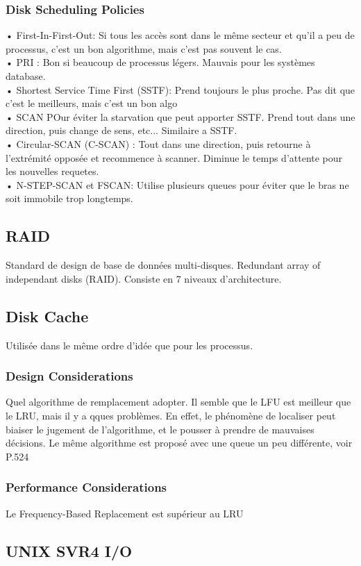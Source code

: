 \subsubsection{Disk Scheduling Policies}
• First-In-First-Out: Si tous les accès sont dans le même secteur et qu’il a peu de processus, c’est un bon algorithme, mais c’est pas souvent le cas. \\
• PRI : Bon si beaucoup de processus légers. Mauvais pour les systèmes database.\\
• Shortest Service Time First (SSTF): Prend toujours le plus proche. Pas dit que
c’est le meilleurs, mais c’est un bon algo \\
• SCAN POur éviter la starvation que peut apporter SSTF. Prend tout dans une direction, puis change de sens, etc... Similaire a SSTF. \\
• Circular-SCAN (C-SCAN) : Tout dans une direction, puis retourne à l’extrémité opposée et recommence à scanner. Diminue le temps d’attente pour les nouvelles requetes. \\
• N-STEP-SCAN et FSCAN: Utilise plusieurs queues pour éviter que le bras ne soit immobile trop longtemps. \\

\subsection{RAID}
Standard de design de base de données multi-disques. Redundant array of independant disks (RAID). Consiste en 7 niveaux d’architecture.
\subsection{Disk Cache}
Utilisée dans le même ordre d’idée que pour les processus.
\subsubsection{Design Considerations}
Quel algorithme de remplacement adopter. Il semble que le LFU est meilleur que le LRU, mais il y a qques problèmes. En effet, le phénomène de localiser peut biaiser le jugement de l’algorithme, et le pousser à prendre de mauvaises décisions. Le même algorithme est proposé avec une queue un peu différente, voir P.524
\subsubsection{Performance Considerations}
Le Frequency-Based Replacement est supérieur au LRU
\subsection{UNIX SVR4 I/O }
